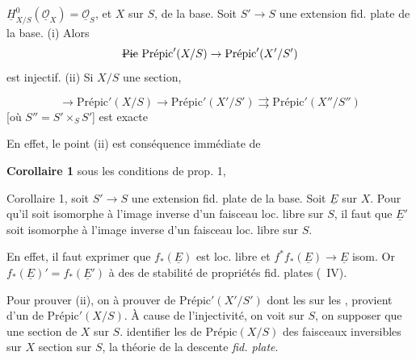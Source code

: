 \documentclass[11pt,a4paper]{article}
\begin{document}

\textbf{} \struck{\ill{}} \ill{} \ill{} \ill{} \ill{} $\underline{H}^{0}_{X/S}(\underline{\mathcal{O}}_{X}) = \underline{\mathcal{O}}_{S}$, et $X$   sur $S$, \ill{} \ill{} \ill{} \ill{} \ill{} \ill{} \ill{} \ill{}   de la base. Soit $S' \to S$ une extension  fid. plate de la base. (i) Alors
\[
\text{\struck{$\mathrm{Pic}$}}\ \text{Prépic}'(X/S) \to \text{Prépic}'(X'/S')
\]
est injectif. (ii) Si $X/S$  \struck{\ill{}} \ill{} une section, \ill{} \ill{} \ill{} \ill{}

\[
\to \text{Prépic}'(X/S) \to \text{Prépic}'(X'/S') \rightrightarrows \text{Prépic}'(X''/S'')
\]
[où $S'' = S' \times_{S} S'$] est exacte \struck{\ill{} \ill{} \ill{}}


\struck{\ill{}} En effet, le point (ii) est \ill{} \ill{} conséquence immédiate de

\textbf{Corollaire 1} sous les conditions de prop. 1, 

Corollaire 1, soit $S' \to S$ une extension  fid. plate de la base. Soit $\underline{E}$ \struck{\ill{}}  \struck{\ill{}} sur $X$. Pour qu'il soit isomorphe \struck{\ill{}} à l'image inverse d'un faisceau loc. libre sur $S$, il faut que $\underline{E}'$ soit isomorphe à l'image inverse d'un faisceau loc. libre sur $S$.

En effet, il faut exprimer que $f_{*}(\underline{E})$ est loc. libre et \struck{\ill{}} $f^{*}f_{*}(\underline{E}) \to \underline{E}$ \ill{} isom. Or $f_{*}(\underline{E})' = f_{*}(\underline{E}')$  \ill{} \ill{}  à des   de stabilité de propriétés  \ill{} fid. plates (\ IV).

Pour prouver (ii), on \ill{}  à prouver \ill{} \ill{} \ill{} de $\text{Prépic}'(X'/S')$ dont les  sur les \ill{}, provient d'un \ill{} de $\text{Prépic}'(X/S)$. À cause de l'injectivité, on voit  \ill{} \ill{} sur $S$, on \ill{}  supposer que \ill{} \ill{} une section de $X$ sur $S$. \ill{} \ill{} \ill{} identifier les   de $\text{Prépic}(X/S)$  \ill{} des faisceaux inversibles sur $X$  section  sur $S$,   \ill{}  la théorie de la descente \emph{fid. plate}.
\end{document}
